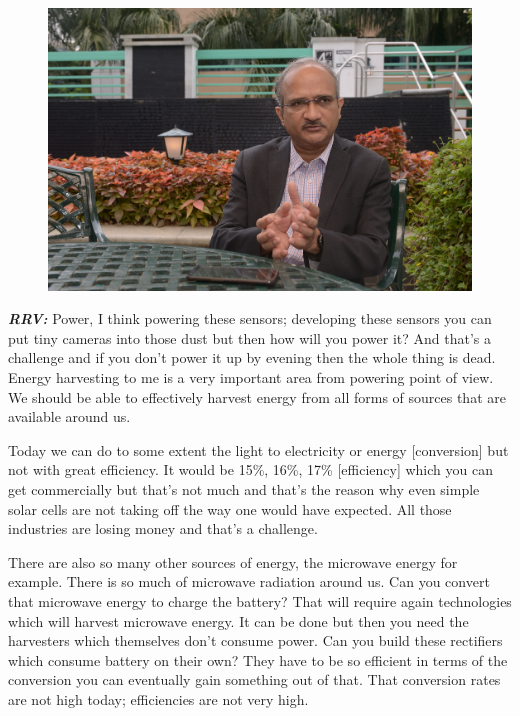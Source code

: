 \begin{multicols}{2}
\begin{figure}[H]
\centering
\includegraphics[scale=.59]{src/Figures/interview/interview-fig11.jpg}
\vspace{-.5cm}
\end{figure}

\textbf{\textit{RRV:}} Power, I think powering these sensors; developing these sensors you can put tiny cameras into those dust but then how will you power it? And that’s a challenge and if you don’t power it up by evening then the whole thing is dead. Energy harvesting to me is a very important area from powering point of view. We should be able to effectively harvest energy from all forms of sources that are available around us.

Today we can do to some extent the light to electricity or energy [conversion] but not with great efficiency. It would be 15\%, 16\%, 17\% [efficiency] which you can get commercially but that’s not much and that’s the reason why even simple solar cells are not taking off the way one would have expected. All those industries are losing money and that’s a challenge.

There are also so many other sources of energy, the microwave energy for example. There is so much of microwave radiation around us. Can you convert that microwave energy to charge the battery? That will require again technologies which will harvest microwave energy. It can be done but then you need the harvesters which themselves don’t consume power. Can you build these rectifiers which consume battery on their own? They have to be so efficient in terms of the conversion you can eventually gain something out of that. That conversion rates are not high today; efficiencies are not very high. 


\end{multicols}
